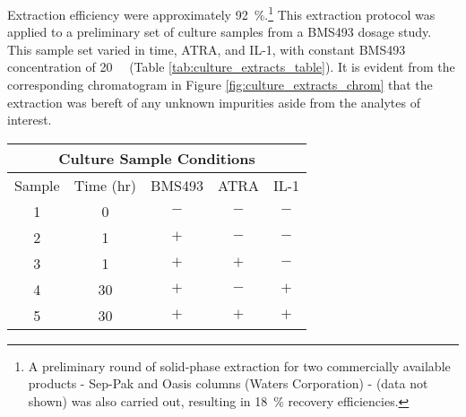 \begin{refsection}
Extraction efficiency were approximately \SI{92}{\percent}.\footnote{A
    preliminary round of solid-phase extraction for two commercially available
    products - Sep-Pak  and Oasis columns (Waters Corporation) - (data
    not shown) was also carried out, resulting in \SI{18}{\percent} recovery
efficiencies.}
This extraction protocol was applied to a preliminary set of culture samples
from a BMS493 dosage study. This sample set varied in time, ATRA, and IL-1, with
constant BMS493 concentration of \SI{20}{\micro\moLar} (Table
\ref{tab:culture_extracts_table}). It is evident from the corresponding
chromatogram in Figure \ref{fig:culture_extracts_chrom} that the extraction was
bereft of any unknown impurities aside from the analytes of interest. 

\begin{table}[h!]
    \centering
\begin{tabular}{ ccccc }
  \hline
  \multicolumn{5}{c}{Culture Sample Conditions} \\
  \hline
  Sample & Time (hr) & BMS493 & ATRA & IL-1 \\
  \hline

  1 & 0 & ${-}$ & ${-}$ & ${-}$ \\
  2 & 1 & ${+}$ & ${-}$ & ${-}$ \\
  3 & 1 & ${+}$ & ${+}$ & ${-}$ \\
  4 & 30 & ${+}$ & ${-}$ & ${+}$ \\
  5 & 30 & ${+}$ & ${+}$ & ${+}$ \\


\end{tabular}
\end{table}
\end{refsection}
